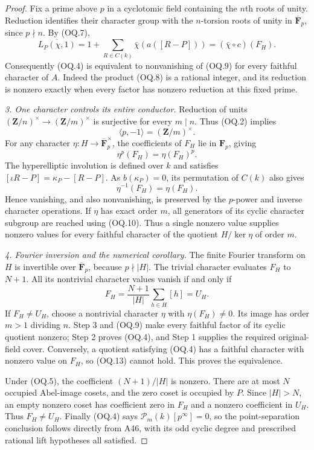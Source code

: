 \begin{proof}
Fix a prime above $p$ in a cyclotomic field containing the $n$th
roots of unity. Reduction identifies their character group with
the $n$-torsion roots of unity in $\overline{\mathbf F}_p$, since
$p\nmid n$. By (OQ.7),
\[
        \overline{L_P(\chi,1)}
          =1+\sum_{R\in C(k)}\bar\chi(a([R-P]))
          =(\bar\chi\circ c)(F_H).
 \tag{OQ.9}
\]
Consequently (OQ.4) is equivalent to nonvanishing of (OQ.9)
for every faithful character of $A$. Indeed the product (OQ.8)
is a rational integer, and its reduction is nonzero exactly
when every factor has nonzero reduction at this fixed prime.

\emph{3. One character controls its entire conductor.}
Reduction of units $(\mathbf Z/n)^\times\to(\mathbf Z/m)^\times$
is surjective for every $m\mid n$. Thus (OQ.2) implies
\[
             \langle p,-1\rangle=(\mathbf Z/m)^\times.
 \tag{OQ.10}
\]
For any character $\eta:H\to\overline{\mathbf F}_p^\times$,
the coefficients of $F_H$ lie in $\mathbf F_p$, giving
\[
                 \eta^p(F_H)=\eta(F_H)^p.
 \tag{OQ.11}
\]
The hyperelliptic involution is defined over $k$ and satisfies
$[\iota R-P]=\kappa_P-[R-P]$.
As $b(\kappa_P)=0$, its permutation of $C(k)$ also gives
\[
                         \eta^{-1}(F_H)=\eta(F_H).
 \tag{OQ.12}
\]
Hence vanishing, and also nonvanishing, is preserved by the
$p$-power and inverse character operations. If $\eta$ has
exact order $m$, all generators of its cyclic character subgroup
are reached using (OQ.10). Thus a single nonzero value supplies
nonzero values for every faithful character of the quotient
$H/\ker\eta$ of order $m$.

\emph{4. Fourier inversion and the numerical corollary.}
The finite Fourier transform on $H$ is invertible over
$\overline{\mathbf F}_p$, because $p\nmid|H|$.
The trivial character evaluates $F_H$ to $N+1$.
All its nontrivial character values vanish if and only if
\[
                   F_H=\frac{N+1}{|H|}\sum_{h\in H}[h]=U_H.
 \tag{OQ.13}
\]
If $F_H\ne U_H$, choose a nontrivial character $\eta$ with
$\eta(F_H)\ne0$. Its image has order $m>1$ dividing $n$.
Step 3 and (OQ.9) make every faithful factor of its cyclic
quotient nonzero; Step 2 proves (OQ.4), and Step 1 supplies
the required original-field cover. Conversely, a quotient
satisfying (OQ.4) has a faithful character with nonzero value
on $F_H$, so (OQ.13) cannot hold. This proves the equivalence.

Under (OQ.5), the coefficient $(N+1)/|H|$ is nonzero.
There are at most $N$ occupied Abel-image cosets, and the zero
coset is occupied by $P$. Since $|H|>N$, an empty nonzero coset
has coefficient zero in $F_H$ and a nonzero coefficient in
$U_H$. Thus $F_H\ne U_H$. Finally (OQ.4) says
$\mathcal P_m(k)[p^\infty]=0$, so the point-separation
conclusion follows directly from A46, with its odd cyclic
degree and prescribed rational lift hypotheses all satisfied.
\end{proof}

